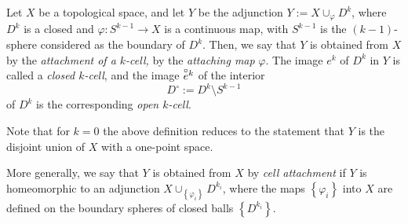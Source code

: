 \documentclass[12pt]{article}
\newtheorem{rmk}{Remark}
\newcommand{\funcsig}[2]{#1\rightarrow #2}
\newcommand{\funcdef}[3]{#1\colon\funcsig{#2}{#3}}
\newcommand{\bdry}{\partial}
\newcommand{\set}[1]{{\left\{#1\right\}}}
\newcommand{\oce}{\smash{\overset{\circ}e}}
\newcommand{\ocD}{D^\circ}
\begin{document}

Let $X$ be a topological space,
and let $Y$ be the adjunction
$Y := X\cup_\varphi D^k$,
where $D^k$ is a closed 
and $\funcdef{\varphi}{S^{k-1}}{X}$ is a continuous map,
with $S^{k-1}$ is the $(k-1)$-sphere considered as the boundary of $D^k$.
Then, we say that $Y$ is obtained from $X$
by the {\em attachment of a $k$-cell,} by the {\em attaching map} $\varphi.$
The image $e^k$ of $D^k$ in $Y$ is called a {\em closed $k$-cell},
and the image $\oce^k$ of the interior
\[
  \ocD := D^k\setminus S^{k-1}
\]
of $D^k$ is the corresponding {\em open $k$-cell}.

Note that for $k=0$ the above definition reduces to
the statement that $Y$ is the disjoint union of $X$ with a one-point space.

More generally, we say that $Y$ is obtained from $X$ by {\em cell attachment\/}
if $Y$ is homeomorphic to an adjunction $X\cup_\set{\varphi_i} D^{k_i}$,
where the maps $\set{\varphi_i}$ into $X$
are defined on the boundary spheres of closed balls $\set{D^{k_i}}$.

%
\end{document}
